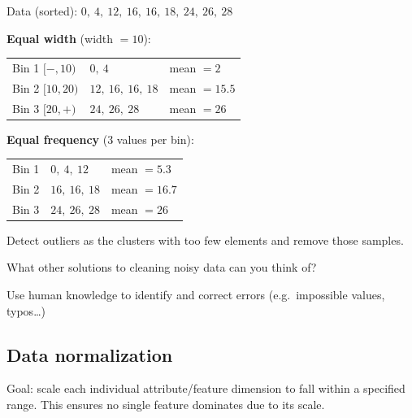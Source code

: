 \documentclass[11pt,a4paper,openany]{book}
\begin{document}
\begin{exbox}[title=Binning example]
Data (sorted): $0,\ 4,\ 12,\ 16,\ 16,\ 18,\ 24,\ 26,\ 28$

\medskip
\textbf{Equal width} (width $= 10$):
\begin{center}
\renewcommand{\arraystretch}{1.2}
\begin{tabular}{l l l}
Bin 1 $[-,10)$ & $0,\ 4$ & mean $= 2$ \\
Bin 2 $[10,20)$ & $12,\ 16,\ 16,\ 18$ & mean $= 15.5$ \\
Bin 3 $[20,+)$ & $24,\ 26,\ 28$ & mean $= 26$ \\
\end{tabular}
\end{center}

\medskip
\textbf{Equal frequency} (3 values per bin):
\begin{center}
\renewcommand{\arraystretch}{1.2}
\begin{tabular}{l l l}
Bin 1 & $0,\ 4,\ 12$ & mean $= 5.3$ \\
Bin 2 & $16,\ 16,\ 18$ & mean $= 16.7$ \\
Bin 3 & $24,\ 26,\ 28$ & mean $= 26$ \\
\end{tabular}
\end{center}
\end{exbox}

\begin{defnbox}[title=Clustering to detect outliers]
Detect outliers as the clusters with too few elements and remove those samples.
\end{defnbox}

\begin{rembox}[title=Discussion]
What other solutions to cleaning noisy data can you think of?

\medskip
Use human knowledge to identify and correct errors (e.g.\ impossible values, typos\dots)
\end{rembox}

\vspace{8cm}

\subsection{Data normalization}

Goal: scale each individual attribute/feature dimension to fall within a specified range. This ensures no single feature dominates due to its scale.
\end{document}
